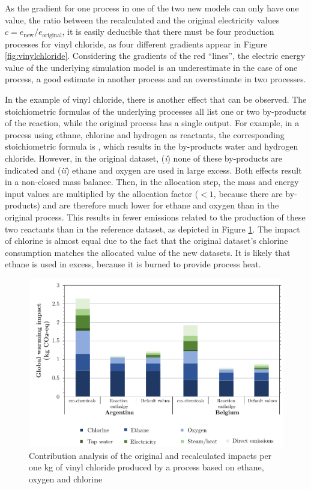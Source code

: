 As the gradient for one process in one of the two new models can only have one value, the ratio between the recalculated and the original electricity values $c = {e_{\mathrm{new}}}/{e_{\mathrm{original}}}$, it is easily deducible that there must be four production processes for vinyl chloride, as four different gradients appear in Figure \ref{fig:vinylchloride}. Considering the gradients of the red ``lines'', the electric energy value of the underlying simulation model is an underestimate in the case of one process, a good estimate in another process and an overestimate in two processes. 

In the example of vinyl chloride, there is another effect that can be observed. The stoichiometric formulas of the underlying processes all list one or two by-products of the reaction, while the original process has a single output. For example, in a process using ethane, chlorine and hydrogen as reactants, the corresponding stoichiometric formula is , which results in the by-products water and hydrogen chloride. However, in the original dataset, (\textit{i}) none of these by-products are indicated and (\textit{ii}) ethane and oxygen are used in large excess. Both effects result in a non-closed mass balance. Then, in the allocation step, the mass and energy input values are multiplied by the allocation factor ($<1$, because there are by-products) and are therefore much lower for ethane and oxygen than in the original process. This results in fewer emissions related to the production of these two reactants than in the reference dataset, as depicted in Figure \ref{fig:contribution vinylchloride}. The impact of chlorine is almost equal due to the fact that the original dataset's chlorine consumption matches the allocated value of the new datasets. It is likely that ethane is used in excess, because it is burned to provide process heat.

\begin{figure}[htp!]
        \centering
        \includegraphics[width=\textwidth]{images/contribution_vinylchloride.pdf}
        \caption{Contribution analysis of the original and recalculated impacts per one kg of vinyl chloride produced by a process based on ethane, oxygen and chlorine}
        \label{fig:contribution vinylchloride}
\end{figure}

